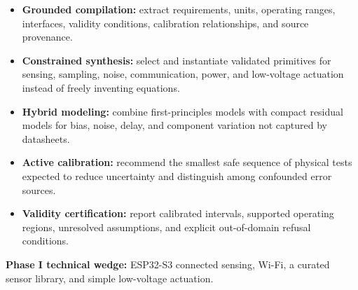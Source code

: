 \documentclass[a4paper,10pt]{article}
\newcommand{\sectiontitle}[1]{\vspace{1mm}{\fontsize{13}{14}\selectfont\bfseries\color{VMDark}#1}\par\vspace{1mm}}
\begin{document}
\sectiontitle{Proposed Technical Architecture}

\begin{vmBox}{}
\centering
{}

\vspace{2mm}
\begin{minipage}{0.96\linewidth}
\begin{itemize}
\item \textbf{Grounded compilation:} extract requirements, units, operating ranges, interfaces, validity conditions, calibration relationships, and source provenance.
\item \textbf{Constrained synthesis:} select and instantiate validated primitives for sensing, sampling, noise, communication, power, and low-voltage actuation instead of freely inventing equations.
\item \textbf{Hybrid modeling:} combine first-principles models with compact residual models for bias, noise, delay, and component variation not captured by datasheets.
\item \textbf{Active calibration:} recommend the smallest safe sequence of physical tests expected to reduce uncertainty and distinguish among confounded error sources.
\item \textbf{Validity certification:} report calibrated intervals, supported operating regions, unresolved assumptions, and explicit out-of-domain refusal conditions.
\end{itemize}
\end{minipage}

\vspace{1mm}
\colorbox{VMLight}{\parbox{0.94\linewidth}{\centering\textbf{Phase I technical wedge:} ESP32-S3 connected sensing, Wi-Fi, a curated sensor library, and simple low-voltage actuation.}}
\end{vmBox}
\end{document}
